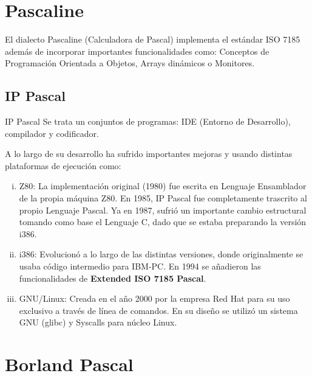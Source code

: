 


\section{Pascaline}

El dialecto Pascaline (Calculadora de Pascal) implementa el estándar ISO 
7185 además de incorporar importantes funcionalidades como: Conceptos de 
Programación Orientada a Objetos, Arrays dinámicos o Monitores.

\subsection{IP Pascal}

%

IP Pascal Se trata un conjuntos de programas: IDE (Entorno de Desarrollo), 
compilador y codificador. 

A lo largo de su desarrollo ha sufrido importantes mejoras y usando 
distintas plataformas de ejecución como:

\begin{enumerate}[i.]

\item {}Z80: La implementación original (1980) fue escrita en Lenguaje 
Ensamblador de la propia máquina Z80. En 1985, IP Pascal fue completamente 
trascrito al propio Lenguaje Pascal. Ya en 1987, sufrió un importante cambio 
estructural tomando como base el Lenguaje C, dado que se estaba preparando la 
versión i386.

\item {}i386: Evolucionó a lo largo de las distintas versiones, donde originalmente se
usaba código intermedio para IBM-PC. En 1994 se añadieron las funcionalidades 
de \textbf{Extended ISO 7185 Pascal}.

\item {}GNU/Linux: Creada en el año 2000 por la empresa Red Hat para su uso 
exclusivo a través de línea de comandos. En su diseño se utilizó un sistema 
GNU (glibc) y Syscalls para núcleo Linux.

\end{enumerate}

\section{Borland Pascal}

